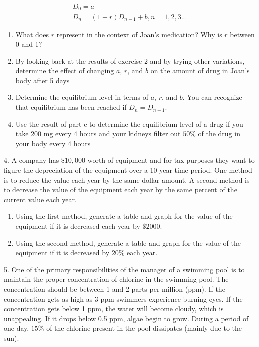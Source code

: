 \documentclass[10pt,]{book}
\theoremstyle{plain}
\theoremstyle{definition}
\theoremstyle{definition}
\theoremstyle{definition}
\numberwithin{equation}{section}
\begin{document}
\begin{exerciselist}
\begin{gather*}
D_0=a\\
D_n=(1-r) D_{n-1}+b, n=1,2,3...
\end{gather*}
\leavevmode%
\begin{enumerate}[label=(\alph*)]
\item\hypertarget{li-15}{}What does \(r\) represent in the context of Joan's medication?  Why is \(r\) between 0 and 1?%
\item\hypertarget{li-16}{}By looking back at the results of exercise 2 and by trying other variations, determine the effect of changing \(a\), \(r\), and \(b\) on the amount of drug in Joan's body after 5 days%
\item\hypertarget{li-17}{}Determine the equilibrium level in terms of \(a\), \(r\), and \(b\).  You can recognize that equilibrium has been reached if  \(D_n=D_{n-1}\).%
\item\hypertarget{li-18}{}Use the result of part c to determine the equilibrium level of a drug if you take 200 mg every 4 hours and your kidneys filter out \(50\%\) of the drug in your body every 4 hours%
\end{enumerate}
%
\par\smallskip
\item[4.]\hypertarget{exercise-6}{}A company has \(\$10,000\) worth of equipment and for tax purposes they want to figure the depreciation of the equipment over a 10-year time period.  One method is to reduce the value each year by the same dollar amount.  A second method is to decrease the value of the equipment each year by the same percent of the current value each year. \leavevmode%
\begin{enumerate}[label=(\alph*)]
\item\hypertarget{li-19}{}Using the first method, generate a table and graph for the value of the equipment if it is  decreased each year by \(\$2000\).%
\item\hypertarget{li-20}{}Using the second method, generate a table and graph for the value of the equipment if it is decreased by \(20\%\) each year.%
\end{enumerate}
%
\par\smallskip
\item[5.]\hypertarget{exercise-7}{}One of the primary responsibilities of the manager of a swimming pool is to maintain the proper concentration of chlorine in the swimming pool.  The concentration should be between 1 and 2 parts per million (ppm).  If the concentration gets as high as 3 ppm swimmers experience burning eyes.  If the concentration gets below 1 ppm, the water will become cloudy, which is unappealing.  If it drops below 0.5 ppm, algae begin to grow.  During a period of one day, \(15\%\) of the chlorine present in the pool dissipates (mainly due to the sun). \leavevmode%

\end{exerciselist}
\end{document}
